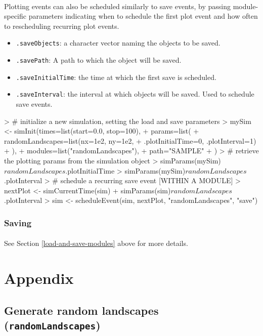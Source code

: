 \documentclass{article}
\begin{document}
\paragraph{}
Plotting events can also be scheduled similarly to save events, by passing module-specific parameters indicating when to schedule the first plot event and how often to rescheduling recurring plot events.

\begin{itemize}
  \item \texttt{.saveObjects}: a character vector naming the objects to be saved.
  \item \texttt{.savePath}: A path to which the object will be saved.
  \item \texttt{.saveInitialTime}: the time at which the first save is scheduled.
  \item \texttt{.saveInterval}: the interval at which objects will be saved. Used to schedule save events.
\end{itemize}

\begin{Schunk}
\begin{Sinput}
> # initialize a new simulation, setting the load and save parameters
> mySim <- simInit(times=list(start=0.0, stop=100),
+                  params=list(
+                    randomLandscapes=list(nx=1e2, ny=1e2,
+                                 .plotInitialTime=0, .plotInterval=1)
+                    ),
+                  modules=list("randomLandscapes"),
+                  path="SAMPLE"
+ )
> # retrieve the plotting params from the simulation object
> simParams(mySim)$randomLandscapes$.plotInitialTime
> simParams(mySim)$randomLandscapes$.plotInterval
> # schedule a recurring save event [WITHIN A MODULE]
> nextPlot <- simCurrentTime(sim) + simParams(sim)$randomLandscapes$.plotInterval
> sim <- scheduleEvent(sim, nextPlot, "randomLandscapes", "save")
\end{Sinput}
\end{Schunk}

\subsubsection{Saving}

\paragraph{}
See Section \ref{load-and-save-modules} above for more details.

\newpage
\appendix
\renewcommand{\thesection}{}
\section{Appendix}
\renewcommand{\thesubsection}{\Alph{subsection}}

\subsection{Generate random landscapes (\texttt{randomLandscapes})}
\end{document}

